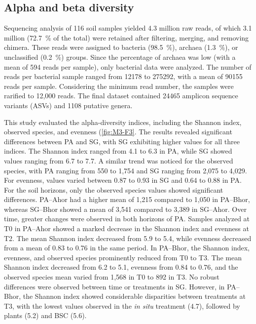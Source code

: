 \subsection{Alpha and beta diversity}

Sequencing analysis of 116 soil samples yielded 4.3 million raw reads, of which 3.1 million (\SI{72.7}{\percent} of the total) were retained after filtering, merging, and removing chimera. These reads were assigned to bacteria (\SI{98.5}{\percent}), archaea (\SI{1.3}{\percent}), or unclassified (\SI{0.2}{\percent}) groups. Since the percentage of archaea was low (with a mean of 594 reads per sample), only bacterial data were analyzed. The number of reads per bacterial sample ranged from \num{12178} to \num{275292}, with a mean of \num{90155} reads per sample. Considering the minimum read number, the samples were rarified to 12,000 reads. The final dataset contained \num{24465} amplicon sequence variants (ASVs) and \num{1108} putative genera.

This study evaluated the alpha-diversity indices, including the Shannon index, observed species, and evenness (\ref{fig:M3-F3}. The results revealed significant differences between PA and SG, with SG exhibiting higher values for all three indices. The Shannon index ranged from 4.1 to 6.3 in PA, while SG showed values ranging from 6.7 to 7.7. A similar trend was noticed for the observed species, with PA ranging from 550 to 1,754 and SG ranging from 2,075 to 4,029. For evenness, values varied between 0.87 to 0.93 in SG and 0.64 to 0.88 in PA. For the soil horizons, only the observed species values showed significant differences. PA--Ahor had a higher mean of 1,215 compared to 1,050 in PA--Bhor, whereas SG--Bhor showed a mean of 3,541 compared to 3,389 in SG--Ahor. Over time, greater changes were observed in both horizons of PA. Samples analyzed at T0 in PA--Ahor showed a marked decrease in the Shannon index and evenness at T2. The mean Shannon index decreased from 5.9 to 5.4, while evenness decreased from a mean of 0.83 to 0.76 in the same period. In PA--Bhor, the Shannon index, evenness, and observed species prominently reduced from T0 to T3. The mean Shannon index decreased from 6.2 to 5.1, evenness from 0.84 to 0.76, and the observed species mean varied from 1,568 in T0 to 892 in T3. No robust differences were observed between time or treatments in SG. However, in PA--Bhor, the Shannon index showed considerable disparities between treatments at T3, with the lowest values observed in the \textit{in situ} treatment (4.7), followed by plants (5.2) and BSC (5.6).

